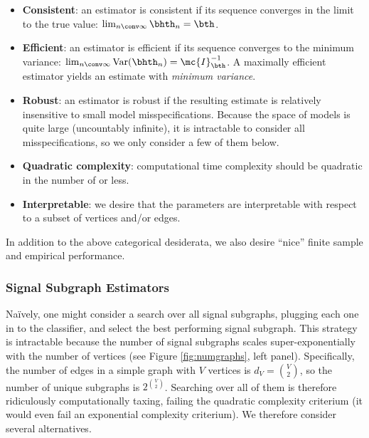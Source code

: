 \documentclass[10pt,journal,cspaper,compsoc]{IEEEtran}
\begin{document}
\begin{itemize}
	\item \textbf{Consistent}: an estimator is consistent if its sequence converges in the limit to the true value: $\lim_{n \conv \infty} \bhth_n = \bth$.  %
	\item \textbf{Efficient}: an estimator is efficient if its sequence converges to the minimum variance: $\lim_{n\conv\infty} \text{Var}(\bhth_n) = \mc{I}_{\bth}^{-1}$.  %
	A maximally efficient estimator yields an estimate with \emph{minimum variance}.
	\item \textbf{Robust}: an estimator is robust if the resulting estimate is relatively insensitive to small model misspecifications.  Because the space of models is quite large (uncountably infinite), it is intractable to consider all misspecifications, so we only consider a few of them below. %
	\item \textbf{Quadratic complexity}: computational time complexity should be quadratic in the number of  or less.
	\item \textbf{Interpretable}: we desire that the parameters are interpretable with respect to a subset of vertices and/or edges.
\end{itemize}
In addition to the above categorical desiderata, we also desire ``nice'' finite sample and empirical performance.


\subsubsection{Signal Subgraph Estimators} %
\label{ssub:subsubsection_name1}


Na\"{i}vely, one might consider a search over all signal subgraphs, plugging each one in to the classifier, and select the best performing signal subgraph.  This strategy is intractable because the number of signal subgraphs scales super-exponentially with the number of vertices (see Figure \ref{fig:numgraphs}, left panel). Specifically, the number of edges in a simple graph with $V$ vertices is $d_V=\binom{V}{2}$, so the number of unique subgraphs is $2^{\binom{V}{2}}$.  Searching over all of them is therefore ridiculously computationally taxing, failing the quadratic complexity criterium (it would even fail an exponential complexity criterium). %
We therefore consider several alternatives.
\end{document}
